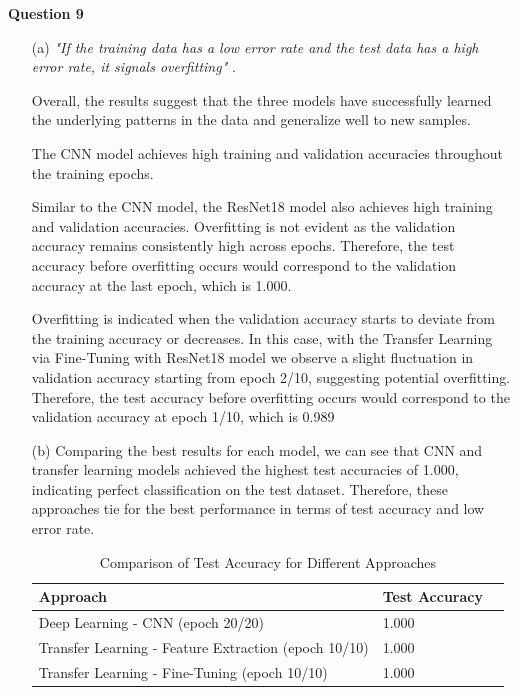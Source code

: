 \documentclass[a4paper,10 pt]{article}
\begin{document}
{\Large \textbf {Question 9}}
\begin{itemize}[]
  \item[(a)] \textit{"If the training data has a low error rate and the test data has a high error rate, it signals overfitting"} \cite{ibm_overfitting}.
  \item[]  Overall, the results suggest that the three models have successfully learned the underlying patterns in the data and generalize well to new samples.
  \item[] The CNN model achieves high training and validation accuracies throughout the training epochs. 
  \item[] Similar to the CNN model, the ResNet18 model also achieves high training and validation accuracies. Overfitting is not evident as the validation accuracy remains consistently high across epochs. Therefore, the test accuracy before overfitting occurs would correspond to the validation accuracy at the last epoch, which is 1.000. 
  \item[] Overfitting is indicated when the validation accuracy starts to deviate from the training accuracy or decreases. In this case, with the Transfer Learning via Fine-Tuning with ResNet18 model we observe a slight fluctuation in validation accuracy starting from epoch 2/10, suggesting potential overfitting. Therefore, the test accuracy before overfitting occurs would correspond to the validation accuracy at epoch 1/10, which is 0.989
  \item[] 
  \item[(b)] Comparing the best results for each model, we can see that CNN and transfer learning models achieved the highest test accuracies of 1.000, indicating perfect classification on the test dataset. Therefore, these approaches tie for the best performance in terms of test accuracy and low error rate.
  \item[] 
  \begin{table}[H]
    \centering
    \caption{Comparison of Test Accuracy for Different Approaches}
    \label{tab:results}
    \begin{tabular}{@{}lll@{}}
    \toprule
    \textbf{Approach} & \textbf{Test Accuracy}  \\ \midrule
    Deep Learning - CNN (epoch 20/20) & 1.000  \\
    Transfer Learning - Feature Extraction (epoch 10/10) & 1.000  \\
    Transfer Learning - Fine-Tuning (epoch 10/10) & 1.000  \\ \bottomrule
    \end{tabular}
    \end{table}


\end{itemize}
\end{document}
